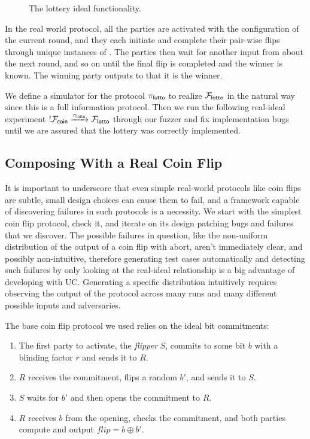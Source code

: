 \begin{figure}
\centering

\caption{The lottery ideal functionality.}
\label{fig:flotto}
\end{figure}

In the real world protocol, all the parties are activated with the
configuration of the current round, and they each initiate and complete their
pair-wise flips through unique instances of \Fcoin.  The parties then wait for
another input from \Z about the next round, and so on until the final flip is
completed and the winner is known.  The winning party outputs to \Z that it is
the winner.

We define a simulator for the protocol $\pi_{{\mathsf {lotto}}}$ to realize
$\mathcal{F}_{{\mathsf {lotto}}}$ in the natural way since this is a full information protocol.
Then we run the following real-ideal experiment $!\mathcal{F}_{{\mathsf {coin}}}
\xrightarrow{\pi_{{\mathsf {lotto}}}} \mathcal{F}_{{\mathsf {lotto}}}$ through our fuzzer and fix
implementation bugs until we are assured that the lottery was correctly
implemented.

\subsection{Composing With a Real Coin Flip}
It is important to underscore that even simple real-world protocols like coin
flips are subtle, small design choices can cause them to fail, and a framework
capable of discovering failures in such protocols is a necessity.  We start
with the simplest coin flip protocol, check it, and iterate on its design
patching bugs and failures that we discover.
The possible failures in question, like the non-uniform distribution of the
output of a coin flip with abort, aren't immediately clear, and possibly
non-intuitive, therefore generating test cases automatically and detecting such
failures by only looking at the real-ideal relationship is a big advantage of
developing with UC. Generating a specific distribution intuitively requires
observing the output of the protocol across many runs and many different
possible inputs and adversaries.

The base coin flip protocol we used relies on the ideal bit commitments:
\begin{enumerate}
    \item The first party to activate, the \emph{flipper} $S$, commits to some bit
        $b$ with a blinding factor $r$ and sends it to $R$.  
    \item $R$ receives the commitment, flips a random $b'$, and sends it to
        $S$.
    \item $S$ waits for $b'$ and then opens the commitment to $R$.
    \item $R$ receives $b$ from the opening, checks the commitment, and both
        parties compute and output $flip = b \oplus b'$.
\end{enumerate}

